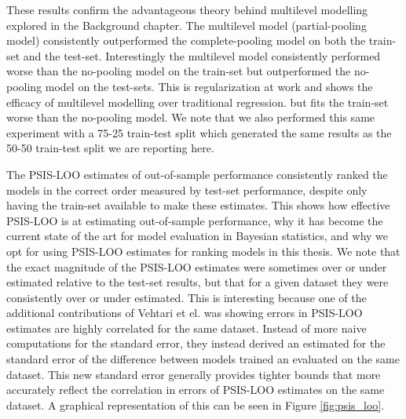 These results confirm the advantageous theory behind multilevel modelling explored in the Background chapter. The multilevel model (partial-pooling model) consistently outperformed the complete-pooling model on both the train-set and the test-set. Interestingly the multilevel model consistently performed worse than the no-pooling model on the train-set but outperformed the no-pooling model on the test-sets. This is regularization at work and shows the efficacy of multilevel modelling over traditional regression. but fits the train-set worse than the no-pooling model. We note that we also performed this same experiment with a 75-25 train-test split which generated the same results as the 50-50 train-test split we are reporting here.

The PSIS-LOO estimates of out-of-sample performance consistently ranked the models in the correct order measured by test-set performance, despite only having the train-set available to make these estimates. This shows how effective PSIS-LOO is at estimating out-of-sample performance, why it has become the current state of the art for model evaluation in Bayesian statistics, and why we opt for using PSIS-LOO estimates for ranking models in this thesis. We note that the exact magnitude of the PSIS-LOO estimates were sometimes over or under estimated relative to the test-set results, but that for a given dataset they were consistently over or under estimated. This is interesting because one of the additional contributions of Vehtari et el. \cite{Vehtari2016} was showing errors in PSIS-LOO estimates are highly correlated for the same dataset. Instead of more naive computations for the standard error, they instead derived an estimated for the standard error of the difference between models trained an evaluated on the same dataset. This new standard error generally provides tighter bounds that more accurately reflect the correlation in errors of PSIS-LOO estimates on the same dataset. A graphical representation of this can be seen in Figure \ref{fig:psis_loo}.

